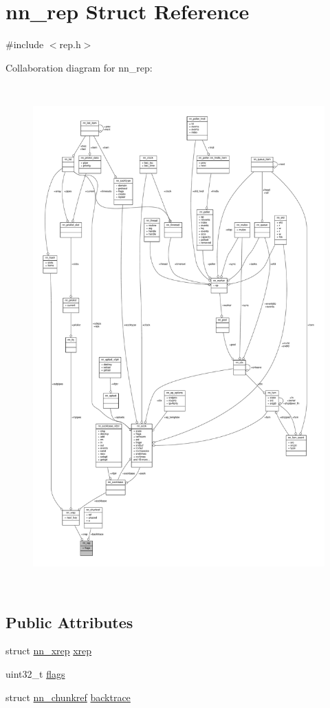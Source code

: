 \hypertarget{structnn__rep}{}\section{nn\+\_\+rep Struct Reference}
\label{structnn__rep}


{\ttfamily \#include $<$rep.\+h$>$}



Collaboration diagram for nn\+\_\+rep\+:\nopagebreak
\begin{figure}[H]
\begin{center}
\leavevmode
\includegraphics[height=550pt]{structnn__rep__coll__graph}
\end{center}
\end{figure}
\subsection*{Public Attributes}
\begin{DoxyCompactItemize}
\item 
struct \hyperlink{structnn__xrep}{nn\+\_\+xrep} \hyperlink{structnn__rep_a3507e3952304e0e106b9ef50b24f163b}{xrep}
\item 
uint32\+\_\+t \hyperlink{structnn__rep_ab14a7c4eee7df0a5fa396ca104d1b542}{flags}
\item 
struct \hyperlink{structnn__chunkref}{nn\+\_\+chunkref} \hyperlink{structnn__rep_a6d121a771946f568bc2c9bcaad475843}{backtrace}
\end{DoxyCompactItemize}


